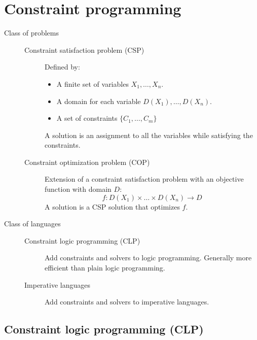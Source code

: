 \chapter{Constraint programming}

\begin{description}
    \item[Class of problems] \phantom{}
        \begin{description}
            \item[Constraint satisfaction problem (CSP)] 
                Defined by:
                \begin{itemize}
                    \item A finite set of variables ${X_1, \dots, X_n}$.
                    \item A domain for each variable $D(X_1), \dots, D(X_n)$.
                    \item A set of constraints $\{ C_1, \dots, C_m \}$
                \end{itemize}
                A solution is an assignment to all the variables while satisfying the constraints.

            \item[Constraint optimization problem (COP)] 
                Extension of a constraint satisfaction problem with an objective function with domain $D$:
                \[ f: D(X_1) \times \dots \times D(X_n) \rightarrow D \]
                A solution is a CSP solution that optimizes $f$.
        \end{description}

    \item[Class of languages] \phantom{}
        \begin{description}
            \item[Constraint logic programming (CLP)] 
                Add constraints and solvers to logic programming.
                Generally more efficient than plain logic programming.

            \item[Imperative languages] 
                Add constraints and solvers to imperative languages.
        \end{description}
\end{description}



\section{Constraint logic programming (CLP)}



